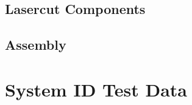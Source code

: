 \section{Lasercut Components}
\section{Assembly}
\chapter{System ID Test Data}
\label{app:systemdat}
